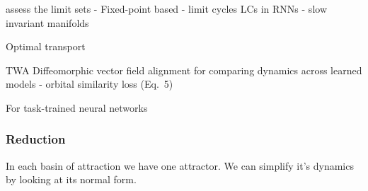 \documentclass{article}
\theoremstyle{definition} \newtheorem{definition}{Definition}  \newtheorem{example}{Example}
\theoremstyle{remark} \newtheorem{remark}{Remark}
\newcounter{ct}
\begin{document}
assess the limit sets
- Fixed-point based \citep{sussillo2013blackbox,katz2017fibers,golub2018fixedpointfinder}
- limit cycles 
LCs in RNNs \citep{townley2000existence} \citep{pals2024inferring}
- slow invariant manifolds\citep{Sagodi2024a}

\citep{libedinsky2023comparing}
\citep{lipshutz2024disentangling} 
\citep{nejatbakhsh2024comparing} Optimal transport
\citep{barbosa2025quantifying} %

TWA\citep{moriel2024timewarpattend}
Diffeomorphic vector field alignment for comparing dynamics across learned models\citep{chen2024dform}
- orbital similarity loss (Eq.~5)

For task-trained neural networks
\citep{huang2024measuring}



\subsubsection{Reduction}\label{sec:reduction} %
In each basin of attraction we have one attractor.
We can simplify it's dynamics by looking at its normal form.
\end{document}
